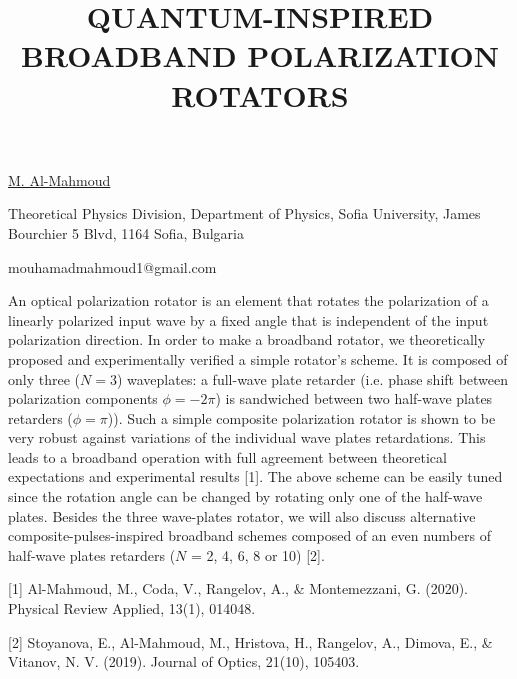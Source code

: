 \title{QUANTUM-INSPIRED BROADBAND POLARIZATION ROTATORS}

\underline{M. Al-Mahmoud} 

{\normalsize{\vspace{-4mm}
Theoretical Physics Division, Department of Physics, Sofia University,
James Bourchier 5 Blvd, 1164 Sofia, Bulgaria



\email mouhamadmahmoud1@gmail.com}}

An optical polarization rotator is an element that rotates the polarization of a linearly polarized input wave by a fixed angle that is independent of the input polarization direction. In order to make a broadband rotator, we theoretically proposed and experimentally verified a simple rotator’s scheme. It is composed of only three ($N=3$) waveplates: a full-wave plate retarder (i.e. phase shift between polarization components $\phi=-2\pi$) is sandwiched between two half-wave plates retarders ($\phi=\pi$)). Such a simple composite polarization rotator is shown to be very robust against variations of the individual wave plates retardations. This leads to a broadband operation with full agreement between theoretical expectations and experimental results [1]. The above scheme can be easily tuned since the rotation angle can be changed by rotating only one of the half-wave plates. Besides the three wave-plates rotator, we will also discuss alternative composite-pulses-inspired broadband schemes composed of an even numbers of half-wave plates retarders ($N$ = 2, 4, 6, 8 or 10) [2].

{\normalsize
[1] Al-Mahmoud, M., Coda, V., Rangelov, A., & Montemezzani, G. (2020). Physical Review Applied, 13(1), 014048.
\vsp

[2] Stoyanova, E., Al-Mahmoud, M., Hristova, H., Rangelov, A., Dimova, E., & Vitanov, N. V. (2019). Journal of Optics, 21(10), 105403.
}

\vspace{\baselineskip}